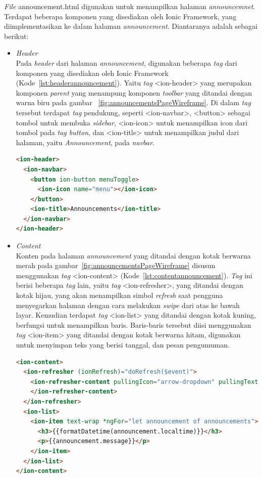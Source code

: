 \begin{itemize}
	\textit{File} announcement.html digunakan untuk menampilkan halaman \textit{announcemnet}. Terdapat beberapa komponen yang disediakan oleh Ionic Framework, yang diimplementasikan ke dalam halaman \textit{announcement}. Diantaranya adalah sebagai berikut:	
	
	\begin{itemize}
		\item \textit{Header} \\
		Pada \textit{header} dari halaman \textit{announcement}, digunakan beberapa \textit{tag} dari komponen yang disediakan oleh Ionic Framework (Kode~\ref{lst:headerannouncement}). Yaitu \textit{tag} <ion-header> yang merupakan komponen \textit{parent} yang menampung komponen \textit{toolbar} yang ditandai dengan warna biru pada gambar ~\ref{fig:announcementsPageWireframe}. Di dalam \textit{tag} tersebut terdapat \textit{tag} pendukung, seperti <ion-navbar>, <button> sebagai tombol untuk membuka \textit{sidebar}, <ion-icon> untuk menampilkan icon dari tombol pada \textit{tag button}, dan <ion-title> untuk menampilkan judul dari halaman, yaitu \textit{Announcement}, pada \textit{navbar}.
\begin{lstlisting}[language=html, label={lst:headerannouncement}, caption=\textit{Header} pada halaman \textit{Annoncement}]
<ion-header>
  <ion-navbar>
    <button ion-button menuToggle>
      <ion-icon name="menu"></ion-icon>
    </button>
    <ion-title>Announcements</ion-title>
  </ion-navbar>
</ion-header>
\end{lstlisting} 

		\item \textit{Content} \\
		Konten pada halaman \textit{announcement} yang ditandai dengan kotak berwarna merah pada gambar~\ref{fig:announcementsPageWireframe} disusun menggunakan \textit{tag} <ion-content> (Kode~\ref{lst:contentannouncement}). \textit{Tag} ini berisi beberapa \textit{tag} lain, yaitu \textit{tag} <ion-refresher>, yang ditandai dengan kotak hijau, yang akan menampilkan simbol \textit{refresh} saat pengguna menyegarkan halaman dengan cara melakukan \textit{swipe} dari atas ke bawah layar. Kemudian terdapat \textit{tag} <ion-list> yang ditandai dengan kotak kuning, berfungsi untuk menampilkan baris. Baris-baris tersebut diisi menggunakan \textit{tag} <ion-item> yang ditandai dengan kotak berwarna hitam, digunakan untuk menyimpan teks yang berisi tanggal, dan pesan pengumuman.
		
\begin{lstlisting}[language=html, label={lst:contentannouncement}, caption=\textit{Content} pada halaman \textit{annoncement}]
<ion-content>
  <ion-refresher (ionRefresh)="doRefresh($event)">
    <ion-refresher-content pullingIcon="arrow-dropdown" pullingText="Pull to refresh" refreshingSpinner="circles" refreshingText="Refreshing...">
    </ion-refresher-content>
  </ion-refresher>
  <ion-list>
    <ion-item text-wrap *ngFor="let announcement of announcements">
      <h3>{{formatDatetime(announcement.localtime)}}</h3>
      <p>{{announcement.message}}</p>
    </ion-item>
  </ion-list>
</ion-content>
\end{lstlisting} 
	\end{itemize}
	

\end{itemize}
